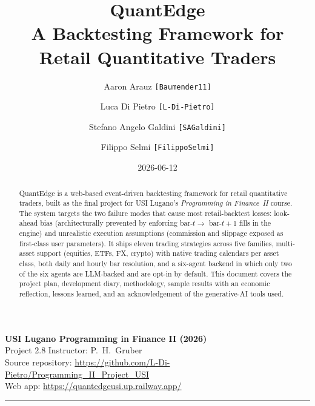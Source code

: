 \documentclass[10pt,a4paper]{article}
\title{%
  \textbf{QuantEdge} \\[4pt]
  \large A Backtesting Framework for Retail Quantitative Traders
}
\author{%
  Aaron Arauz \texttt{[Baumender11]} \and
  Luca Di Pietro \texttt{[L-Di-Pietro]} \and
  Stefano Angelo Galdini \texttt{[SAGaldini]} \and
  Filippo Selmi \texttt{[FilippoSelmi]}
}
\date{2026-06-12}
\begin{document}

\maketitle

\begin{center}
\small
\textbf{USI Lugano \textemdash{} Programming in Finance II (2026)} \\
Project 2.8 \textemdash{} Instructor: P.~H.~Gruber \\
Source repository: \url{https://github.com/L-Di-Pietro/Programming_II_Project_USI} \\
Web app: \url{https://quantedgeusi.up.railway.app/}
\end{center}

\vspace{1em}

\begin{abstract}
\noindent
QuantEdge is a web-based event-driven backtesting framework for retail quantitative
traders, built as the final project for USI Lugano's \emph{Programming in Finance~II}
course. The system targets the two failure modes that cause most retail-backtest losses:
look-ahead bias (architecturally prevented by enforcing bar-$t \to$ bar-$t{+}1$ fills in
the engine) and unrealistic execution assumptions (commission and slippage exposed as
first-class user parameters). It ships eleven trading strategies across five families,
multi-asset support (equities, ETFs, FX, crypto) with native trading calendars per asset
class, both daily and hourly bar resolution, and a six-agent backend in which only two
of the six agents are LLM-backed and are opt-in by default. This document covers the
project plan, development diary, methodology, sample results with an economic
reflection, lessons learned, and an acknowledgement of the generative-AI tools used.
\end{abstract}

\tableofcontents

\vspace{1em}
\hrule
\vspace{1em}








\printbibliography[heading=bibnumbered,title={References}]
\end{document}
